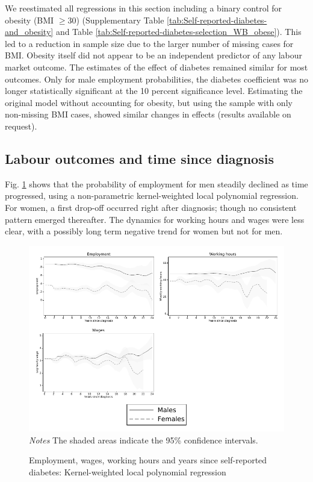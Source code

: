 \documentclass[12pt,english]{article}
\begin{document}
We reestimated all regressions in this section including a binary control for obesity (BMI $\geq 30$) (Supplementary Table \ref{tab:Self-reported-diabetes-and_obesity} and Table \ref{tab:Self-reported-diabetes-selection_WB_obese}). This led to a reduction in sample size due to the larger number of missing cases for BMI. Obesity itself did not appear to be an independent predictor of any labour market outcome. The estimates of the effect of diabetes remained similar for most outcomes. Only for male employment probabilities, the diabetes coefficient was no longer statistically significant at the 10 percent significance level. Estimating the original model without accounting for obesity, but using the sample with only non-missing BMI cases, showed similar changes in effects (results available on request).


\subsection{\label{sec:duration}Labour outcomes and time since diagnosis }

Fig. \ref{fig:Kernel-weighted-local-polynomial_comb} shows that the probability of employment for men steadily declined as time progressed, using a non-parametric kernel-weighted local polynomial regression. For women, a first drop-off occurred right after diagnosis; though no consistent pattern emerged thereafter. The dynamics for working hours and wages were less clear, with a possibly long term negative trend for women but not for men.

\begin{figure}[!ht]
	\caption{\label{fig:Kernel-weighted-local-polynomial_comb}Employment, wages, working hours and years since self-reported diabetes:  Kernel-weighted local polynomial regression}%
	\begin{center}
		\includegraphics[width=\linewidth]{figures/lpoly_combined.pdf}\\
		\footnotesize{\textit{Notes} The shaded areas indicate the 95\% confidence intervals.}
	\end{center}
\end{figure}
\end{document}
